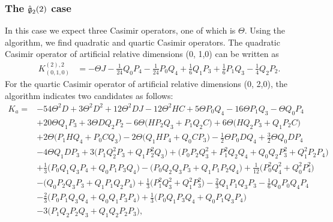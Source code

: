 \documentclass[12pt]{article}
\begin{document}
\subsubsection{The $\mathfrak{\Hat{g}}_{2}(2)$  case }\label{ECGA2}

In this case we expect three Casimir operators, one of which is $\Theta$. Using
the algorithm, we find quadratic and
quartic Casimir operators. The quadratic Casimir operator of artificial
relative dimensions (0, 1,0) can be written as
%
\begin{eqnarray}
&K^{(2),2}_{(0,1,0)}&=-\Theta J- \frac{1}{24} Q_{0} P_{4}- \frac{1}{24} P_{0} Q_{4}+ \frac{1}{6}Q_{1}P_{3}+\frac{1}{6}P_{1}Q_{3}-\frac{1}{4}Q_{2}P_{2}.\label{F2b}
\end{eqnarray}
For the quartic Casimir operator of artificial relative dimensions (0, 2,0), the algorithm indicates two candidates as follows:
\begin{align}
K_a=& -54 \Theta ^2 D +3 \Theta ^2 D^{2}+12 \Theta ^2 D J -12 \Theta ^2 H C +5 \Theta   P_{0} Q_{4}-16  \Theta   P_{1} Q_{3}- \Theta   Q_{0} P_{4} 
\nonumber\\
&+20 \Theta  Q_{1} P_{3}  + 3 \Theta D Q_{2} P_{2} -6 \Theta  \big (H P_{2}Q_{3}+ P_{1}Q_{2}C\big)+6 \Theta  \big(H Q_{2}P_{3}+ Q_{1}P_{2}C\big) 
\nonumber\\
& +2 \Theta  \big (P_{1}HQ_{4}+ P_{0}CQ_{3} \big) -2 \Theta  \big( Q_{1}HP_{4}+ Q_{0}CP_{3}\big)  -\frac{1}{2}  \Theta P_{0} D Q_{4}+ \frac{3}{2} \Theta  Q_{0}  D  P_{4}
\nonumber\\
& -4 \Theta   Q_{1}  D  P_{3}+ 3 \big ( P_{1}Q^{2}_{2}P_{3} +Q_{1}P^{2}_{2}Q_{3} \big)+ \big(P_{0} P_{2}  Q^{2}_{3}+P^{2}_{1}  Q_{2} Q_{4}+ Q_{0} Q_{2} P^{2}_{3}  +Q^{2}_{1} P_{2} P_{4}\big)
\nonumber\\
&    +  \frac{1}{3} \big(  P_{0} Q_{1}  Q_{3} P_{4} +Q_{0}  P_{1} P_{3} Q_{4} \big) - \big ( P_{0}Q_{2}Q_{3}P_{3} +Q_{1}P_{1}P_{2}Q_{4} \big)+\frac{1}{12} \big( P^{2}_{0} Q^{2}_{4}+ Q^{2}_{0} P^{2}_{4} \big)
\nonumber\\
& - \big( Q_{0} P_{2}  Q_{3} P_{3} +Q_{1}  P_{1} Q_{2} P_{4}\big) + \frac{1}{3} \big( P^{2}_{1} Q^{2}_{3}+ Q^{2}_{1} P^{2}_{3} \big) -\frac{2}{3} Q_{1}P_{1}Q_{3}P_{3}-  \frac{1}{6} Q_{0}P_{0}Q_{4}P_{4}
\nonumber\\
&  -\frac{2}{3} \big( P_{0} P_{1} Q_{3}  Q_{4}+  Q_{0} Q_{1} P_{3} P_{4} \big)
+   \frac{1}{3} \big(  P_{0} Q_{1}  P_{3} Q_{4} +Q_{0}  P_{1} Q_{3} P_{4} \big) 
\nonumber\\
&
-3 \big(  P_{1} Q_{2}  P_{2} Q_{3}+Q_{1}  Q_{2}  P_{2}P_{3} \big), 
\end{align}
\end{document}
